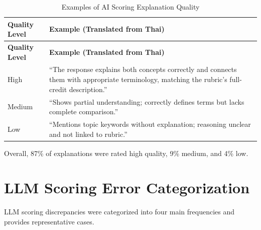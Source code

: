 {
\centering
\begin{longtable}{l p{}}
    \caption{Examples of AI Scoring Explanation Quality}
    \label{tab:explanation_quality}
    \\

    \hline
    \textbf{Quality Level} & \textbf{Example (Translated from Thai)} \\
    \hline
    \endfirsthead

    \hline
    \textbf{Quality Level} & \textbf{Example (Translated from Thai)} \\
    \hline
    \endhead

    \hline
    \endfoot

    High & “The response explains both concepts correctly and connects them with appropriate terminology, matching the rubric’s full-credit description.” \\
    Medium & “Shows partial understanding; correctly defines terms but lacks complete comparison.” \\
    Low & “Mentions topic keywords without explanation; reasoning unclear and not linked to rubric.” \\

\end{longtable}
}

Overall, 87\% of explanations were rated high quality, 
9\% medium, and 4\% low.


\section{LLM Scoring Error Categorization}

LLM scoring discrepancies were categorized into four main 
frequencies and provides representative cases.

